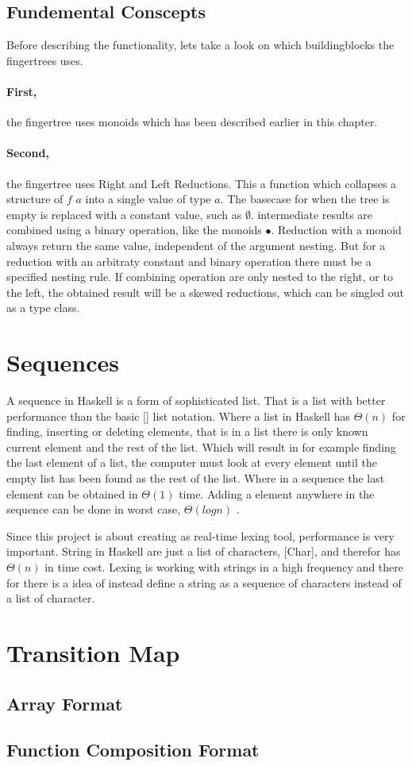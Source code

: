\subsection{Fundemental Conscepts}
Before describing the functionality, lets take a look on which buildingblocks the fingertrees uses.
\paragraph{First,}
the fingertree uses monoids which has been described earlier in this chapter.
\paragraph{Second,} 
the fingertree uses Right and Left Reductions. This a function which collapses a structure of $f$ $a$ into
a single value of type $a$. The basecase for when the tree is empty is replaced with a constant value, such as
$\emptyset$. intermediate results are combined using a binary operation, like the monoids $\bullet$.
Reduction with a monoid always return the same value, independent of the argument nesting. But for a reduction with 
an arbitraty constant and binary operation there must be a specified nesting rule. 
If combining operation are only nested to the right, or to the
left, the obtained result will be a skewed reductions, which can be singled out as a type class.
\cite{fingertree}

\section{Sequences}
A sequence in Haskell is a form of sophisticated list. That is a list with better performance than the basic [] list notation. Where a list in Haskell has $\Theta(n)$ for finding, inserting or deleting elements, that is in a list there is only known current element and the rest of the list. Which will result in for example finding the last element of a list, the computer must look at every element until the empty list has been found as the rest of the list. Where in a sequence the last element can be obtained in $\Theta(1)$ time. Adding a element anywhere in the sequence can be done in worst case, $\Theta(log n)$ \cite{fingertree}. 

Since this project is about creating as real-time lexing tool, performance is very important. String in Haskell are just a list of characters, [Char], and therefor has $\Theta(n)$ in time cost. Lexing is working with strings in a high frequency and there for there is a idea of instead define a string as a sequence of characters instead of a list of character. 

\section{Transition Map}
\subsection{Array Format}
\subsection{Function Composition Format}
